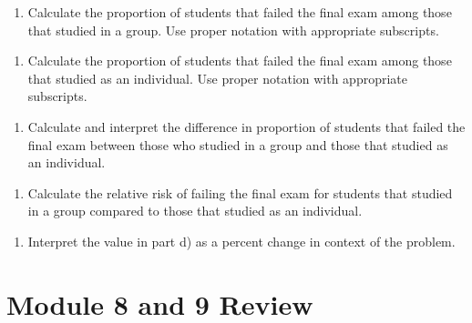 \documentclass[
]{report}
\providecommand{\tightlist}{%
  \setlength{\itemsep}{0pt}\setlength{\parskip}{0pt}}
\begin{document}
\begin{enumerate}
\def\labelenumi{\alph{enumi}.}
\tightlist
\item
  Calculate the proportion of students that failed the final exam among those that studied in a group. Use proper notation with appropriate subscripts.
\end{enumerate}

\vspace{0.6in}

\begin{enumerate}
\def\labelenumi{\alph{enumi}.}
\setcounter{enumi}{1}
\tightlist
\item
  Calculate the proportion of students that failed the final exam among those that studied as an individual. Use proper notation with appropriate subscripts.
\end{enumerate}

\vspace{0.6in}

\begin{enumerate}
\def\labelenumi{\alph{enumi}.}
\setcounter{enumi}{2}
\tightlist
\item
  Calculate and interpret the difference in proportion of students that failed the final exam between those who studied in a group and those that studied as an individual.
\end{enumerate}

\vspace{1.2in}

\begin{enumerate}
\def\labelenumi{\alph{enumi}.}
\setcounter{enumi}{3}
\tightlist
\item
  Calculate the relative risk of failing the final exam for students that studied in a group compared to those that studied as an individual.
\end{enumerate}

\vspace{1in}

\begin{enumerate}
\def\labelenumi{\alph{enumi}.}
\setcounter{enumi}{4}
\tightlist
\item
  Interpret the value in part d) as a percent change in context of the problem.
\end{enumerate}

\newpage

\section{Module 8 and 9 Review}\label{module-8-and-9-review}
\end{document}
